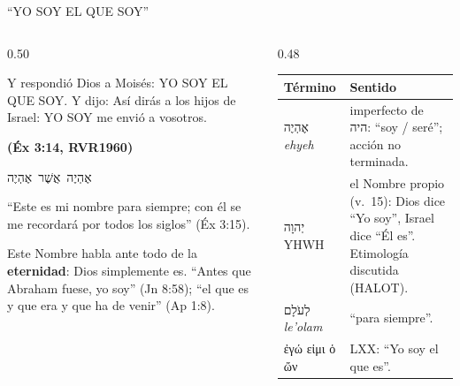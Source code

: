 \documentclass[hyperref={bookmarks=false},aspectratio=169]{beamer}
\newcommand{\heb}[1]{\mbox{\foreignlanguage{hebrew}{#1}}}
\newcommand{\grc}[1]{\foreignlanguage{ancientgreek}{#1}}
\newcommand{\fuente}[1]{\par\hfill{\upshape\bfseries\footnotesize\textcolor{azulp}{#1}}}
\newcommand{\destacar}[1]{\textbf{\textcolor{azulp}{#1}}}
\renewcommand{\arraystretch}{1.3}
\begin{document}
\begin{frame}{``YO SOY EL QUE SOY''}
\begin{columns}[c,onlytextwidth]
\begin{column}{0.50\textwidth}
\begin{cita}Y respondió Dios a Moisés: YO SOY EL QUE SOY. Y dijo: Así dirás a los hijos de Israel: YO SOY me envió a vosotros.\fuente{(Éx 3:14, RVR1960)}\end{cita}
\begin{center}\heb{אֶהְיֶה אֲשֶׁר אֶהְיֶה}\end{center}
\scriptsize ``Este es mi nombre para siempre; con él se me recordará por todos los siglos'' (Éx 3:15).\par\smallskip
\small Este Nombre habla ante todo de la \destacar{eternidad}: Dios simplemente es. ``Antes que Abraham fuese, yo soy'' (Jn 8:58); ``el que es y que era y que ha de venir'' (Ap 1:8).
\end{column}
\begin{column}{0.48\textwidth}\scriptsize
\renewcommand{\arraystretch}{1.2}
\begin{tabular}{@{}>{\RaggedRight\arraybackslash}p{2.0cm}>{\RaggedRight\arraybackslash}p{3.7cm}@{}}
\toprule
\textbf{Término} & \textbf{Sentido} \\ \midrule
\heb{אֶהְיֶה} \emph{ehyeh} & imperfecto de \heb{היה}: ``soy / seré''; acción no terminada. \\
\heb{יְהוָה} YHWH & el Nombre propio (v.~15): Dios dice ``Yo soy'', Israel dice ``Él es''. Etimología discutida (HALOT). \\
\heb{לְעֹלָם} \emph{le'olam} & ``para siempre''. \\
\grc{ἐγώ εἰμι ὁ ὤν} & LXX: ``Yo soy el que es''. \\
\bottomrule
\end{tabular}\par\medskip
{}
\end{column}
\end{columns}
\end{frame}
\end{document}
